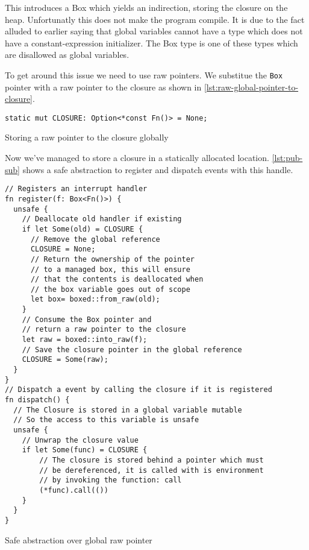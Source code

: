 This introduces a Box which yields an indirection, storing the closure on the heap.
Unfortunatly this does not make the program compile.
It is due to the fact alluded to earlier saying that global variables cannot have a type which does not have a constant-expression initializer.
The Box type is one of these types which are disallowed as global variables.

To get around this issue we need to use raw pointers.
We substitue the \texttt{Box} pointer with a raw pointer to the closure as shown in \autoref{lst:raw-global-pointer-to-closure}.

\begin{listing}[H]
  \begin{verbatim}
static mut CLOSURE: Option<*const Fn()> = None;
  \end{verbatim}
  \caption{Storing a raw pointer to the closure globally}
  \label{lst:raw-global-pointer-to-closure}
\end{listing}

Now we've managed to store a closure in a statically allocated location.
\autoref{lst:pub-sub} shows a safe abstraction to register and dispatch events with this handle.

\begin{listing}[H]
  \begin{verbatim}
// Registers an interrupt handler
fn register(f: Box<Fn()>) {
  unsafe {
    // Deallocate old handler if existing
    if let Some(old) = CLOSURE {
      // Remove the global reference
      CLOSURE = None;
      // Return the ownership of the pointer
      // to a managed box, this will ensure
      // that the contents is deallocated when
      // the box variable goes out of scope
      let box= boxed::from_raw(old);
    }
    // Consume the Box pointer and
    // return a raw pointer to the closure
    let raw = boxed::into_raw(f);
    // Save the closure pointer in the global reference
    CLOSURE = Some(raw);
  }
}
// Dispatch a event by calling the closure if it is registered
fn dispatch() {
  // The Closure is stored in a global variable mutable
  // So the access to this variable is unsafe
  unsafe {
    // Unwrap the closure value
    if let Some(func) = CLOSURE {
        // The closure is stored behind a pointer which must
        // be dereferenced, it is called with is environment
        // by invoking the function: call
        (*func).call(())
    }
  }
}
  \end{verbatim}
  \caption{Safe abstraction over global raw pointer}
  \label{lst:reg-disp}
\end{listing}

